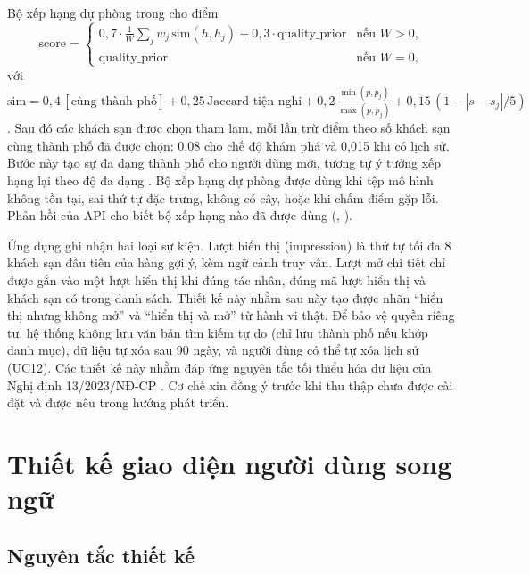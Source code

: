 Bộ xếp hạng dự phòng trong  cho điểm
\begin{equation}
  \text{score} = \begin{cases}
    0{,}7 \cdot \frac{1}{W}\sum_j w_j\, \text{sim}(h, h_j) + 0{,}3 \cdot \text{quality\_prior} & \text{nếu } W > 0,\\
    \text{quality\_prior} & \text{nếu } W = 0,
  \end{cases}
  \label{eq:content-score}
\end{equation}
với $\text{sim} = 0{,}4\,[\text{cùng thành phố}] + 0{,}25\,\text{Jaccard tiện nghi} + 0{,}2\,\frac{\min(p, p_j)}{\max(p, p_j)} + 0{,}15\,(1 - |s - s_j|/5)$. Sau đó các khách sạn được chọn tham lam, mỗi lần trừ điểm theo số khách sạn cùng thành phố đã được chọn: 0,08 cho chế độ khám phá và 0,015 khi có lịch sử. Bước này tạo sự đa dạng thành phố cho người dùng mới, tương tự ý tưởng xếp hạng lại theo độ đa dạng \cite{carbonell1998}. Bộ xếp hạng dự phòng được dùng khi tệp mô hình không tồn tại, sai thứ tự đặc trưng, không có cây, hoặc khi chấm điểm gặp lỗi. Phản hồi của API cho biết bộ xếp hạng nào đã được dùng (, ).

Ứng dụng ghi nhận hai loại sự kiện. Lượt hiển thị (impression) là thứ tự tối đa 8 khách sạn đầu tiên của hàng gợi ý, kèm ngữ cảnh truy vấn. Lượt mở chi tiết chỉ được gắn vào một lượt hiển thị khi đúng tác nhân, đúng mã lượt hiển thị và khách sạn có trong danh sách. Thiết kế này nhằm sau này tạo được nhãn ``hiển thị nhưng không mở'' và ``hiển thị và mở'' từ hành vi thật. Để bảo vệ quyền riêng tư, hệ thống không lưu văn bản tìm kiếm tự do (chỉ lưu thành phố nếu khớp danh mục), dữ liệu tự xóa sau 90 ngày, và người dùng có thể tự xóa lịch sử (UC12). Các thiết kế này nhằm đáp ứng nguyên tắc tối thiểu hóa dữ liệu của Nghị định 13/2023/NĐ-CP \cite{nd13}. Cơ chế xin đồng ý trước khi thu thập chưa được cài đặt và được nêu trong hướng phát triển.

\section{Thiết kế giao diện người dùng song ngữ}\label{sec:ui-design}

\subsection{Nguyên tắc thiết kế}

